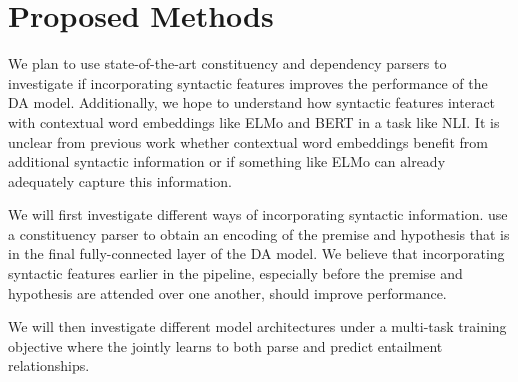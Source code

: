 \documentclass[11pt,a4paper]{article}
\begin{document}
\begin{table}[h]
  \caption{Syntail-v1 and DA model accuracies on the SciTail dataset.}
\label{table:v1-accuracies}
\end{table}

\section{Proposed Methods}
\label{methods}

We plan to use state-of-the-art constituency \citep{Stern2017-co} and
dependency \citep{Dozat2016-gs} parsers to investigate if incorporating
syntactic features improves the performance of the DA model. Additionally, we
hope to understand how syntactic features interact with contextual word
embeddings like ELMo \citep{Peters2018-fz} and BERT \citep{Devlin2018-qc} in a
task like NLI. It is unclear from previous work whether contextual word
embeddings benefit from additional syntactic information or if something like
ELMo can already adequately capture this information.

We will first investigate different ways of incorporating syntactic
information. \citet{Pang2018-syntail} use a constituency parser to obtain an
encoding of the premise and hypothesis that is in the final fully-connected
layer of the DA model. We believe that incorporating syntactic features earlier
in the pipeline, especially before the premise and hypothesis are attended over
one another, should improve performance.

We will then investigate different model architectures under a multi-task
training objective where the jointly learns to both parse and predict
entailment relationships.
\end{document}
